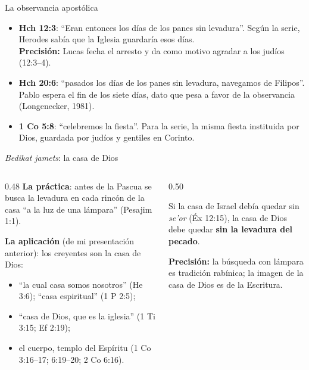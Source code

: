 \documentclass[hyperref={bookmarks=false},aspectratio=169]{beamer}
\newcommand{\destacar}[1]{\textbf{\textcolor{tierraroja}{#1}}}
\newcommand{\precision}[1]{{\footnotesize\color{sepia}\textbf{Precisión:} #1}}
\begin{document}
\begin{frame}{La observancia apostólica}
\small
\begin{itemize}
\item \destacar{Hch 12:3}: ``Eran entonces los días de los panes sin levadura''. Según la serie, Herodes sabía que la Iglesia guardaría esos días.\\
\precision{Lucas fecha el arresto y da como motivo agradar a los judíos (12:3--4).}
\item \destacar{Hch 20:6}: ``pasados los días de los panes sin levadura, navegamos de Filipos''. Pablo espera el fin de los siete días, dato que pesa a favor de la observancia (Longenecker, 1981).
\item \destacar{1 Co 5:8}: ``celebremos la fiesta''. Para la serie, la misma fiesta instituida por Dios, guardada por judíos y gentiles en Corinto.
\end{itemize}
\end{frame}

\begin{frame}{\emph{Bedikat jamets}: la casa de Dios}
\begin{columns}[t,onlytextwidth]
\begin{column}{0.48\textwidth}\small
\destacar{La práctica}: antes de la Pascua se busca la levadura en cada rincón de la casa ``a la luz de una lámpara'' (Pesajim 1:1).\par\medskip
\destacar{La aplicación} (de mi presentación anterior): los creyentes son la casa de Dios:
\begin{itemize}
\item ``la cual casa somos nosotros'' (He 3:6); ``casa espiritual'' (1 P 2:5);
\item ``casa de Dios, que es la iglesia'' (1 Ti 3:15; Ef 2:19);
\item el cuerpo, templo del Espíritu (1 Co 3:16--17; 6:19--20; 2 Co 6:16).
\end{itemize}
\end{column}
\begin{column}{0.50\textwidth}
\begin{tcolorbox}[colback=papiro,colframe=tierraroja,boxrule=1pt,arc=3pt]
\small\centering Si la casa de Israel debía quedar sin \emph{se'or} (Éx 12:15), la casa de Dios debe quedar \destacar{sin la levadura del pecado}.
\end{tcolorbox}
\precision{la búsqueda con lámpara es tradición rabínica; la imagen de la casa de Dios es de la Escritura.}
\end{column}
\end{columns}
\end{frame}
\end{document}
